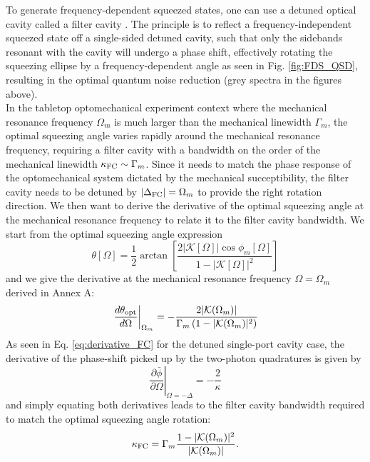 To generate frequency-dependent squeezed states, one can use a detuned optical cavity called a filter cavity \cite{klmtv}. The principle is to reflect a frequency-independent squeezed state off a single-sided detuned cavity, such that only the sidebands resonant with the cavity will undergo a phase shift, effectively rotating the squeezing ellipse by a frequency-dependent angle as seen in Fig. \ref{fig:FDS_QSD}, resulting in the optimal quantum noise reduction (grey spectra in the figures above).  \\ 

In the tabletop optomechanical experiment context where the mechanical resonance frequency $\Omega_m$ is much larger than the mechanical linewidth $\Gamma_m$, the optimal squeezing angle varies rapidly around the mechanical resonance frequency, requiring a filter cavity with a bandwidth on the order of the mechanical linewidth $\kappa_{\rm FC} \sim \Gamma_m$. Since it needs to match the phase response of the optomechanical system dictated by the mechanical succeptibility, the filter cavity needs to be detuned by $|\Delta_{\rm FC}| = \Omega_m$ to provide the right rotation direction. We then want to derive the derivative of the optimal squeezing angle at the mechanical resonance frequency to relate it to the filter cavity bandwidth. We start from the optimal squeezing angle expression
\begin{equation*}
  \theta[\Omega] = \dfrac{1}{2} \arctan \left[\dfrac{2|\mathcal{K}[\Omega]|\cos \phi_m[\Omega]}{1 - |\mathcal{K}[\Omega]|^2}\right]
\end{equation*}
and we give the derivative at the mechanical resonance frequency $\Omega = \Omega_m$ derived in Annex A:
\begin{equation}
  \left.\frac{d\theta_{\rm opt}}{d\Omega}\right|_{\Omega_m}
=
-\frac{2|\mathcal K(\Omega_m)|}{\Gamma_m\left(1-|\mathcal K(\Omega_m)|^2\right)}
\end{equation}
As seen in Eq. \ref{eq:derivative_FC} for the detuned single-port cavity case, the derivative of the phase-shift picked up by the two-photon quadratures is given by 
\begin{equation*}
  \left.\dfrac{\partial \bar \phi}{\partial \Omega}\right|_{\Omega = -\Delta} = -\dfrac{2}{\kappa}
\end{equation*}
and simply equating both derivatives leads to the filter cavity bandwidth required to match the optimal squeezing angle rotation:
\begin{equation}
  \kappa_{\rm FC} = \Gamma_m   \dfrac{1 - |\mathcal K(\Omega_m)|^2}{|\mathcal K(\Omega_m)|}. 
  \label{eq:derivative_FC2}
\end{equation}
